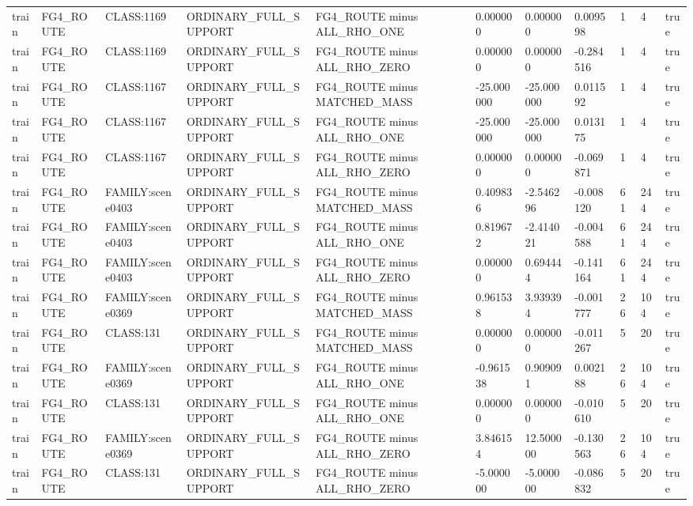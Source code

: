 \begin{tabular}{lllllllllll}
train & FG4\_ROUTE & CLASS:1169 & ORDINARY\_FULL\_SUPPORT & FG4\_ROUTE minus ALL\_RHO\_ONE & 0.000000 & 0.000000 & 0.009598 & 1 & 4 & true \\
train & FG4\_ROUTE & CLASS:1169 & ORDINARY\_FULL\_SUPPORT & FG4\_ROUTE minus ALL\_RHO\_ZERO & 0.000000 & 0.000000 & -0.284516 & 1 & 4 & true \\
train & FG4\_ROUTE & CLASS:1167 & ORDINARY\_FULL\_SUPPORT & FG4\_ROUTE minus MATCHED\_MASS & -25.000000 & -25.000000 & 0.011592 & 1 & 4 & true \\
train & FG4\_ROUTE & CLASS:1167 & ORDINARY\_FULL\_SUPPORT & FG4\_ROUTE minus ALL\_RHO\_ONE & -25.000000 & -25.000000 & 0.013175 & 1 & 4 & true \\
train & FG4\_ROUTE & CLASS:1167 & ORDINARY\_FULL\_SUPPORT & FG4\_ROUTE minus ALL\_RHO\_ZERO & 0.000000 & 0.000000 & -0.069871 & 1 & 4 & true \\
train & FG4\_ROUTE & FAMILY:scene0403 & ORDINARY\_FULL\_SUPPORT & FG4\_ROUTE minus MATCHED\_MASS & 0.409836 & -2.546296 & -0.008120 & 61 & 244 & true \\
train & FG4\_ROUTE & FAMILY:scene0403 & ORDINARY\_FULL\_SUPPORT & FG4\_ROUTE minus ALL\_RHO\_ONE & 0.819672 & -2.414021 & -0.004588 & 61 & 244 & true \\
train & FG4\_ROUTE & FAMILY:scene0403 & ORDINARY\_FULL\_SUPPORT & FG4\_ROUTE minus ALL\_RHO\_ZERO & 0.000000 & 0.694444 & -0.141164 & 61 & 244 & true \\
train & FG4\_ROUTE & FAMILY:scene0369 & ORDINARY\_FULL\_SUPPORT & FG4\_ROUTE minus MATCHED\_MASS & 0.961538 & 3.939394 & -0.001777 & 26 & 104 & true \\
train & FG4\_ROUTE & CLASS:131 & ORDINARY\_FULL\_SUPPORT & FG4\_ROUTE minus MATCHED\_MASS & 0.000000 & 0.000000 & -0.011267 & 5 & 20 & true \\
train & FG4\_ROUTE & FAMILY:scene0369 & ORDINARY\_FULL\_SUPPORT & FG4\_ROUTE minus ALL\_RHO\_ONE & -0.961538 & 0.909091 & 0.002188 & 26 & 104 & true \\
train & FG4\_ROUTE & CLASS:131 & ORDINARY\_FULL\_SUPPORT & FG4\_ROUTE minus ALL\_RHO\_ONE & 0.000000 & 0.000000 & -0.010610 & 5 & 20 & true \\
train & FG4\_ROUTE & FAMILY:scene0369 & ORDINARY\_FULL\_SUPPORT & FG4\_ROUTE minus ALL\_RHO\_ZERO & 3.846154 & 12.500000 & -0.130563 & 26 & 104 & true \\
train & FG4\_ROUTE & CLASS:131 & ORDINARY\_FULL\_SUPPORT & FG4\_ROUTE minus ALL\_RHO\_ZERO & -5.000000 & -5.000000 & -0.086832 & 5 & 20 & true \\

\end{tabular}
